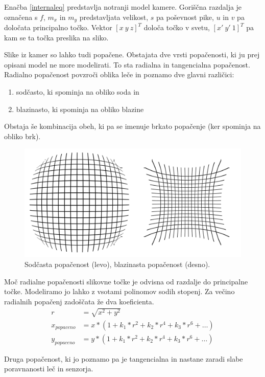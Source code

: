 \documentclass[a4paper, 12pt]{book}
\begin{document}
Enačba \eqref{internaleq} predstavlja notranji model kamere. Goriščna razdalja je označena s $f$, $m_x$ in $m_y$ predstavljata velikost, $s$ pa poševnost pike, $u$ in $v$ pa določata principalno točko. Vektor $[x \ y \ z]^T$ določa točko v svetu, $[x' \ y' \ 1]^T$ pa kam se ta točka preslika na sliko.

Slike iz kamer so lahko tudi popačene. Obstajata dve vrsti popačenosti, ki ju prej opisani model ne more modelirati. To sta radialna in tangencialna popačenost. Radialno popačenost povzroči oblika leče in poznamo dve glavni različici:
\begin{enumerate}
\itemsep0em
\item sodčasto, ki spominja na obliko soda in
\item blazinasto, ki spominja na obliko blazine
\end{enumerate}
Obstaja še kombinacija obeh, ki pa se imenuje brkato popačenje (ker spominja na obliko brk).

\begin{figure}[H]
\centering
\includegraphics[width=\textwidth,height=\textheight,keepaspectratio]{distorsion.png}
\caption{Sodčasta popačenost (levo), blazinasta popačenost (desno).}
\end{figure}

Moč radialne popačenosti slikovne točke je odvisna od razdalje do principalne točke. Modeliramo jo lahko z vsotami polinomov sodih stopenj. Za večino radialnih popačenj zadoščata že dva koeficienta. 
\begin{align}
\label{radialdisteq}
r &= \sqrt{x^2 + y^2} \\ 
x_{popaceno} &= x * (1 + k_1*r^2 + k_2*r^4 + k_3*r^6 + \dots) \\
y_{popaceno} &= y * (1 + k_1*r^2 + k_2*r^4 + k_3*r^6 + \dots)
\end{align}

Druga popačenost, ki jo poznamo pa je tangencialna in nastane zaradi slabe poravnanosti leč in senzorja.
\end{document}
